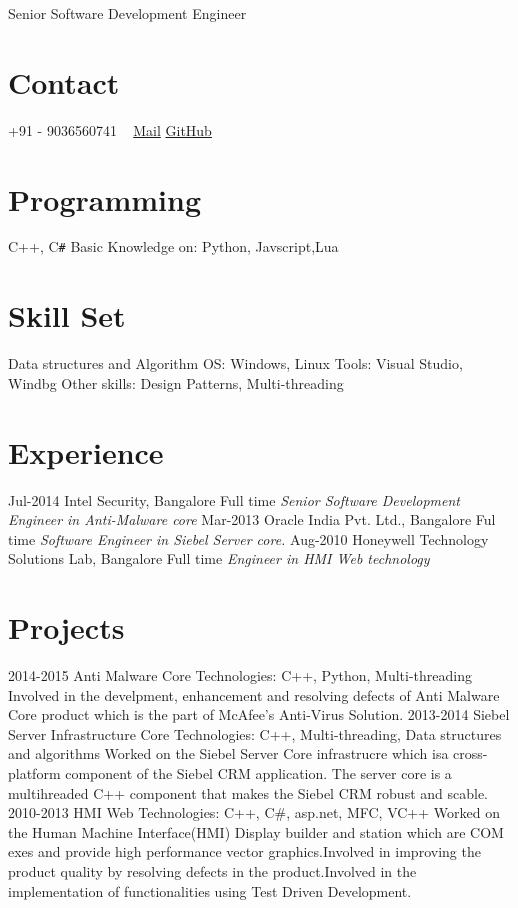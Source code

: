 \documentclass[]{kartikkumar-cv}
\begin{document}
       {Senior Software Development Engineer}
          
\begin{aside}
  \section{Contact}
    +91 - 9036560741
    ~
    \href{mailto:kartik.rao24@gmail.com}{Mail}
    \href{https://github.com/raokartikkumar24}{GitHub}
    ~
  \section{Programming}
    C++, C\texttt{\#}
    Basic Knowledge on:
    Python, Javscript,Lua
    ~
   \section{Skill Set}
   Data structures and Algorithm
   OS: Windows, Linux
   Tools: Visual Studio, Windbg
   Other skills: Design Patterns, Multi-threading
\end{aside}

\section{Experience}

\begin{entrylist}
  \entry
    {Jul-2014}
    {Intel Security, Bangalore}
    {Full time}
    {\emph{Senior Software Development Engineer in Anti-Malware core}}
  \entry
    {Mar-2013}
    {Oracle India Pvt. Ltd., Bangalore}
    {Ful time}
    {\emph{Software Engineer in Siebel Server core.}}
  \entry
    {Aug-2010}
    {Honeywell Technology Solutions Lab, Bangalore}
    {Full time}
    {\emph{Engineer in HMI Web technology}}
\end{entrylist}

\section{Projects}

\begin{entrylist}
  \entry
    {2014-2015}
    {Anti Malware Core}
    {Technologies: C++, Python, Multi-threading}
    {Involved in the develpment, enhancement and resolving defects of Anti
    Malware Core product which is the part of McAfee's Anti-Virus Solution.}
  \entry
    {2013-2014}
    {Siebel Server Infrastructure Core}
    {Technologies: C++, Multi-threading, Data structures and algorithms }
    {Worked on the Siebel Server Core infrastrucre which isa cross-platform
    component of the Siebel CRM application. The server core is a multihreaded
    C++ component that makes the Siebel CRM robust and scable.}
  \entry
    {2010-2013}
    {HMI Web}
    {Technologies: C++, C\#, asp.net, MFC, VC++}
    {Worked on the Human Machine Interface(HMI) Display builder and station
    which are COM exes and provide high performance vector graphics.Involved in improving the product quality by resolving defects in the product.Involved in the implementation of functionalities using Test Driven
    Development.}
\end{entrylist}
\end{document}
